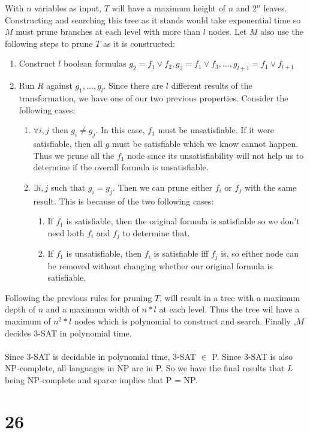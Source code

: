 \documentclass[letterpaper,notitlepage,twoside]{article}
\begin{document}
With $n$ variables as input, $T$ will have a maximum height of $n$ and $2^n$ leaves. Constructing and searching this tree as it stands would take exponential time so $M$ must prune branches at each level with more than $l$ nodes. Let $M$ also use the following steps to prune $T$ as it is constructed:
\begin{enumerate}
\item Construct $l$ boolean formulas $g_2 = f_1 \lor f_2,g_3 = f_1 \lor f_3,...,g_{l+1} = f_1 \lor f_{l+1}$
\item Run $R$ against $g_1,...,g_l$. Since there are $l$ different results of the transformation, we have one of our two previous properties. Consider the following cases:
\begin{enumerate}
\item $\forall i,j$ then $g_i \neq g_j$. In this case, $f_1$ must be unsatisfiable. If it were satisfiable, then all $g$ must be satisfiable which we know cannot happen. Thus we prune all the $f_1$ node since its unsatisfiability will not help us to determine if the overall formula is unsatisfiable.
\item $\exists i,j$ such that $g_i = g_j$. Then we can prune either $f_i$ or $f_j$ with the same result. This is because of the two following cases:
\begin{enumerate}
\item If $f_1$ is satisfiable, then the original formula is satisfiable so we don't need both $f_i$ and $f_j$ to determine that.
\item If $f_1$ is unsatisfiable, then $f_i$ is satisfiable iff $f_j$ is, so either node can be removed without changing whether our original formula is satisfiable.
\end{enumerate}
\end{enumerate}
\end{enumerate}
Following the previous rules for pruning $T$, will result in a tree with a maximum depth of $n$ and a maximum width of $n*l$ at each level. Thus the tree wil have a maximum of $n^2*l$ nodes which is polynomial to construct and search. Finally ,$M$ decides 3-SAT in polynomial time.
\\\\
Since 3-SAT is decidable in polynomial time, 3-SAT $\in $ P. Since 3-SAT is also NP-complete, all languages in NP are in P. So we have the final results that $L$ being NP-complete and sparse implies that P = NP.
\section*{26}
\end{document}
